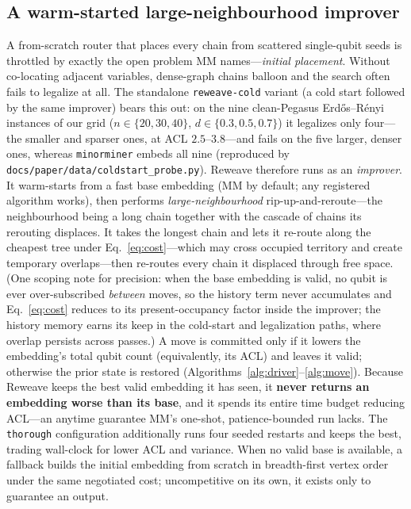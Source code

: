 \documentclass[acmsmall,anonymous,nonacm]{acmart}
\begin{document}
\subsection{A warm-started large-neighbourhood improver}
\label{sec:improver}
A from-scratch router that places every chain from scattered single-qubit seeds
is throttled by exactly the open problem MM names---\emph{initial placement}.
Without co-locating adjacent variables, dense-graph chains balloon and the search
often fails to legalize at all. The standalone \texttt{reweave-cold} variant
(a cold start followed by the same improver) bears this out: on the nine
clean-Pegasus Erd\H{o}s--R\'enyi instances of our grid
($n\in\{20,30,40\}$, $d\in\{0.3,0.5,0.7\}$) it legalizes only four---the smaller
and sparser ones, at ACL $2.5$--$3.8$---and fails on the five larger, denser ones,
whereas
\texttt{minorminer} embeds all nine
(reproduced by \texttt{docs/paper/data/coldstart\_probe.py}).
Reweave therefore runs as an \emph{improver}. It warm-starts from a fast base
embedding (MM by default; any registered algorithm works), then performs
\emph{large-neighbourhood} rip-up-and-reroute---the neighbourhood being a long
chain together with the cascade of chains its rerouting displaces. It takes the
longest chain and lets it re-route along the cheapest tree under
Eq.~\eqref{eq:cost}---which may cross occupied territory and create temporary
overlaps---then re-routes every chain it displaced through free space. (One
scoping note for precision: when the base embedding is valid, no qubit is ever
over-subscribed \emph{between} moves, so the history term never accumulates and
Eq.~\eqref{eq:cost} reduces to its present-occupancy factor inside the improver;
the history memory earns its keep in the cold-start and legalization paths, where
overlap persists across passes.) A move is
committed only if it lowers the embedding's total qubit count (equivalently, its
ACL) and leaves it valid; otherwise the prior state is restored
(Algorithms~\ref{alg:driver}--\ref{alg:move}). Because Reweave keeps the best
valid embedding it has seen, it \textbf{never returns an embedding worse than its
base}, and it spends its entire time budget reducing ACL---an anytime guarantee
MM's one-shot, patience-bounded run lacks. The \texttt{thorough} configuration
additionally runs four seeded restarts and keeps the best, trading wall-clock for
lower ACL and variance. When no valid base is available, a fallback builds the
initial embedding from scratch in breadth-first vertex order under the same
negotiated cost; uncompetitive on its own, it exists only to guarantee an output.
\end{document}
